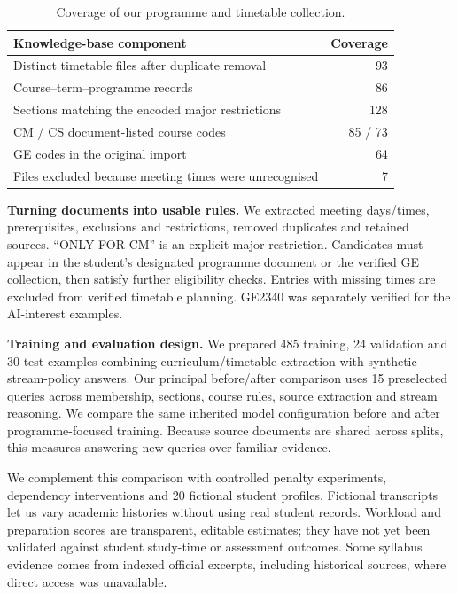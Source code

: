 \documentclass{article}
\begin{document}
\begin{table}[H]
\centering\small
\caption{Coverage of our programme and timetable collection.}
\begin{tabular}{p{3.85in}r}
\toprule
Knowledge-base component & Coverage\\
\midrule
Distinct timetable files after duplicate removal & 93\\
Course--term--programme records & 86\\
Sections matching the encoded major restrictions & 128\\
CM / CS document-listed course codes & 85 / 73\\
GE codes in the original import & 64\\
Files excluded because meeting times were unrecognised & 7\\
\bottomrule
\end{tabular}
\label{tab:data}
\end{table}

\textbf{Turning documents into usable rules.} We extracted meeting days/times, prerequisites, exclusions and restrictions, removed duplicates and retained sources. ``ONLY FOR CM'' is an explicit major restriction. Candidates must appear in the student's designated programme document or the verified GE collection, then satisfy further eligibility checks. Entries with missing times are excluded from verified timetable planning. GE2340 was separately verified for the AI-interest examples.

\newpage
\textbf{Training and evaluation design.} We prepared 485 training, 24 validation and 30 test examples combining curriculum/timetable extraction with synthetic stream-policy answers. Our principal before/after comparison uses 15 preselected queries across membership, sections, course rules, source extraction and stream reasoning. We compare the same inherited model configuration before and after programme-focused training. Because source documents are shared across splits, this measures answering new queries over familiar evidence.

We complement this comparison with controlled penalty experiments, dependency interventions and 20 fictional student profiles. Fictional transcripts let us vary academic histories without using real student records. Workload and preparation scores are transparent, editable estimates; they have not yet been validated against student study-time or assessment outcomes. Some syllabus evidence comes from indexed official excerpts, including historical sources, where direct access was unavailable.
\end{document}

